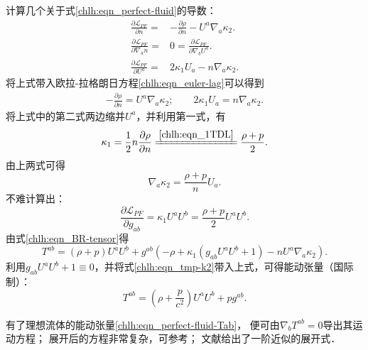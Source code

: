 计算几个关于式\eqref{chlh:eqn_perfect-fluid}的导数：
\begin{align}
    \frac{\partial \mathscr{L}_{PF}}{\partial n} = &
    -\frac{\partial\rho }{\partial n} - U^a \nabla_a\kappa_2 .\\
    \frac{\partial \mathscr{L}_{PF}}{\partial \nabla_a n} = &
    0 = \frac{\partial \mathscr{L}_{PF}}{\partial \nabla_b U^a} . \\
    \frac{\partial \mathscr{L}_{PF}}{\partial U^a} = &
    2\kappa_1 U_a - n \nabla_a \kappa_2 .
\end{align}
将上式带入欧拉-拉格朗日方程\eqref{chlh:eqn_euler-lag}可以得到
\begin{align}
    -\frac{\partial\rho }{\partial n}  = U^a \nabla_a\kappa_2; \qquad
    2\kappa_1 U_a = n \nabla_a \kappa_2 .
\end{align}
将上式中的第二式两边缩并$U^a$，并利用第一式，有
\begin{equation}\label{chlh:eqn_tmp-k1}
    \kappa_1 = \frac{1}{2}n \frac{\partial\rho }{\partial n}
    \xlongequal{\ref{chlh:eqn_1TDL}} \frac{\rho+p}{2} .
\end{equation}
由上两式可得
\begin{equation}\label{chlh:eqn_tmp-k2}
    \nabla_a \kappa_2 = \frac{\rho+p}{n} U_a . 
\end{equation}
不难计算出：
\begin{equation}
    \frac{\partial \mathscr{L}_{PF}}{\partial g_{ab}} = 
    \kappa_1 U^a U^b = \frac{\rho+p}{2} U^a U^b .
\end{equation}
由式\eqref{chlh:eqn_BR-tensor}得
\begin{equation*}
    T^{ab}  %
    =(\rho + p)U^a U^b + g^{ab} \left( -\rho
    +\kappa_1\left(g_{ab}U^a U^b+1 \right) 
    -n U^a \nabla_a\kappa_2 \right) .
\end{equation*}
利用$g_{ab}U^a U^b+1\equiv 0$，并将式\eqref{chlh:eqn_tmp-k2}带入上式，可得能动张量（国际制）：
\begin{equation}\label{chlh:eqn_perfect-fluid-Tab}
    T^{ab}=\left(\rho  + \frac{p}{c^2}  \right) U^a U^b +p g^{ab} .
\end{equation}

有了理想流体的能动张量\eqref{chlh:eqn_perfect-fluid-Tab}，
便可由$\nabla_b T^{ab}=0$导出其运动方程；
展开后的方程非常复杂，可参考\parencite{nelson-1981}；
文献\parencite[\S 39.11]{mtw1973}给出了一阶近似的展开式．



